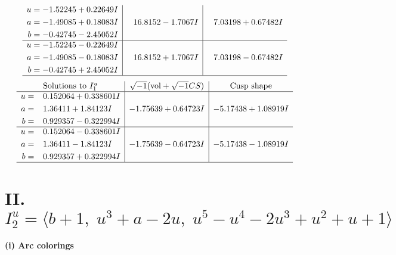 \documentclass[1p]{elsarticle_modified}
\theoremstyle{definition}
\newcommand{\I}{\sqrt{-1}}
\begin{document}
$$\begin{array}{c|c|c}
\begin{aligned}
u &= -1.52245 + 0.22649 I \\
a &= -1.49085 + 0.18083 I \\
b &= -0.42745 - 2.45052 I\end{aligned}
 & \phantom{-}16.8152 - 1.7067 I & \phantom{-}7.03198 + 0.67482 I \\ \hline\begin{aligned}
u &= -1.52245 - 0.22649 I \\
a &= -1.49085 - 0.18083 I \\
b &= -0.42745 + 2.45052 I\end{aligned}
 & \phantom{-}16.8152 + 1.7067 I & \phantom{-}7.03198 - 0.67482 I\\
 \hline 
 \end{array}$$\newpage$$\begin{array}{c|c|c}  
\text{Solutions to }I^u_{1}& \I (\text{vol} + \sqrt{-1}CS) & \text{Cusp shape}\\
 \hline 
\begin{aligned}
u &= \phantom{-}0.152064 + 0.338601 I \\
a &= \phantom{-}1.36411 + 1.84123 I \\
b &= \phantom{-}0.929357 - 0.322994 I\end{aligned}
 & -1.75639 + 0.64723 I & -5.17438 + 1.08919 I \\ \hline\begin{aligned}
u &= \phantom{-}0.152064 - 0.338601 I \\
a &= \phantom{-}1.36411 - 1.84123 I \\
b &= \phantom{-}0.929357 + 0.322994 I\end{aligned}
 & -1.75639 - 0.64723 I & -5.17438 - 1.08919 I\\
 \hline 
 \end{array}$$\newpage\newpage\renewcommand{\arraystretch}{1}
\centering \section*{II. $I^u_{2}= \langle b+1,\;u^3+a-2 u,\;u^5- u^4-2 u^3+u^2+u+1 \rangle$}
\flushleft \textbf{(i) Arc colorings}\\
\end{document}

